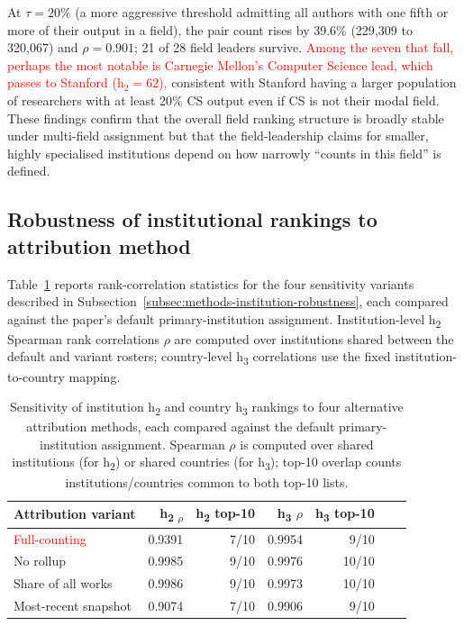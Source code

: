 At $\tau = 20\%$ (a more aggressive threshold admitting all authors with one fifth or more of their output in a field), the pair count rises by 39.6\% (229{,}309 to 320{,}067) and $\rho = 0.901$; 21 of 28 field leaders survive. \textcolor{red}{Among the seven that fall, perhaps the most notable is Carnegie Mellon's Computer Science lead, which passes to Stanford ($\mathrm{h}_2 = 62$),} consistent with Stanford having a larger population of researchers with at least 20\% CS output even if CS is not their modal field. These findings confirm that the overall field ranking structure is broadly stable under multi-field assignment but that the field-leadership claims for smaller, highly specialised institutions depend on how narrowly ``counts in this field'' is defined.

\subsection{Robustness of institutional rankings to attribution method}
\label{subsec:results-institution-robustness}
Table~\ref{tab:attribution-sensitivity} reports rank-correlation statistics for the four sensitivity variants described in Subsection~\ref{subsec:methods-institution-robustness}, each compared against the paper's default primary-institution assignment. Institution-level h\textsubscript{2} Spearman rank correlations $\rho$ are computed over institutions shared between the default and variant rosters; country-level h\textsubscript{3} correlations use the fixed institution-to-country mapping.

\begin{table}[h]
    \centering
    \small
    \caption{Sensitivity of institution h\textsubscript{2} and country h\textsubscript{3} rankings to four alternative attribution methods, each compared against the default primary-institution assignment. Spearman $\rho$ is computed over shared institutions (for h\textsubscript{2}) or shared countries (for h\textsubscript{3}); top-10 overlap counts institutions/countries common to both top-10 lists.}
    \label{tab:attribution-sensitivity}
    \begin{tabular}{@{}lrrrrrr@{}}
    \toprule
    Attribution variant & h\textsubscript{2 $\rho$} & h\textsubscript{2} top-10 & h\textsubscript{3} $\rho$ & h\textsubscript{3} top-10 \\
    \midrule
    \textcolor{red}{Full-counting} & 0.9391 & 7/10 & 0.9954 & 9/10 \\
    No rollup & 0.9985 & 9/10 & 0.9976 & 10/10 \\
    Share of all works & 0.9986 & 9/10 & 0.9973 & 10/10 \\
    Most-recent snapshot & 0.9074 & 7/10 & 0.9906 & 9/10 \\
    \bottomrule
    \end{tabular}
\end{table}

